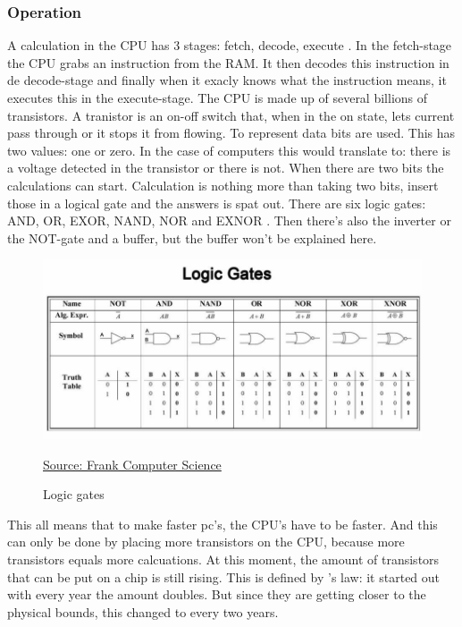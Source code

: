 \subsubsection{Operation} \label{working}
A calculation in the CPU has 3 stages: fetch, decode, execute \autocite{CPU}.
In the fetch-stage the CPU grabs an instruction from the RAM. It then decodes this instruction in de decode-stage and finally when it exacly knows what the instruction means, it executes this in the execute-stage.
The CPU is made up of several billions of transistors. A tranistor is an on-off switch that, when in the on state, lets current pass through or it stops it from flowing.
To represent data bits are used. This has two values: one or zero\autocite{bit}. In the case of computers this would translate to: there is a voltage detected in the transistor or there is not.
When there are two bits the calculations can start. Calculation is nothing more than taking two bits, insert those in a logical gate and the answers is spat out.
There are six logic gates: AND, OR, EXOR, NAND, NOR and EXNOR \autocite{gates}. Then there's also the inverter or the NOT-gate and a buffer, but the buffer won't be explained here.

\begin{figure} [h]
    \centering
    \includegraphics[width=\textwidth]{img/gates.jpg}
        \caption{Logic gates}
        \label{fig:logicGates}
        \href{https://frankcomputerscience.wordpress.com/chapter-3/}{Source: Frank Computer Science}
\end{figure}

This all means that to make faster pc's, the CPU's have to be faster. And this can only be done by placing more transistors on the CPU, because more transistors equals more calcuations.
At this moment, the amount of transistors that can be put on a chip is still rising. This is defined by \textcite{Moore1965}'s law: it started out with every year the amount doubles. But since they are getting closer to the physical bounds, this changed to every two years.


